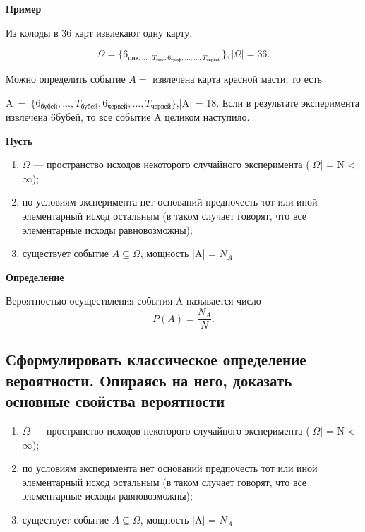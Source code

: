 \textbf{Пример}

Из колоды в 36 карт извлекают одну карту.

\begin{equation}
	\Omega = \{6_{\text{пик}, \dots\ , T_{\text{пик}}, 6_{\text{треф}}, \dots, \dots, T_{\text{червей}}}\}, |\Omega| = 36.
\end{equation} 

Можно определить событие $A = $ {извлечена карта красной масти}, то есть 
	
A~=~$\{6_{\text{бубей}}, \dots, T_{\text{бубей}}, 6_{\text{червей}}, \dots, T_{\text{червей}}  \}$,|A| = 18. Если в результате эксперимента извлечена $6 бубей$, то все событие A целиком наступило.

\textbf{Пусть}

\begin{enumerate}
	\item $\Omega$ --- пространство исходов некоторого случайного эксперимента (|$\Omega$| = N < $\infty$);
	\item по условиям эксперимента нет оснований предпочесть тот или иной элементарный исход остальным (в таком случает говорят, что все элементарные исходы равновозможны);
	\item существует событие $A \subseteq \Omega$, мощность |A| = $N_A$
\end{enumerate}

\textbf{Определение}

Вероятностью осуществления события A называется число 
\begin{equation}
	P(A) = \frac{N_A}{N}.
\end{equation}

\subsection{Сформулировать классическое определение вероятности. Опираясь на него, доказать основные свойства вероятности}

\begin{enumerate}
	\item $\Omega$ --- пространство исходов некоторого случайного эксперимента (|$\Omega$| = N < $\infty$);
	\item по условиям эксперимента нет оснований предпочесть тот или иной элементарный исход остальным (в таком случает говорят, что все элементарные исходы равновозможны);
	\item существует событие $A \subseteq \Omega$, мощность |A| = $N_A$
\end{enumerate}

